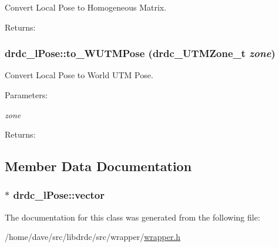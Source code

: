 Convert Local Pose to Homogeneous Matrix. 

\begin{Desc}
\item[Returns:]\end{Desc}
\hypertarget{classdrdc__lPose_1e5f7f1156fd80a1b41aa1e11e56dab4}{
\subsubsection[to\_\-WUTMPose]{ drdc\_\-lPose::to\_\-WUTMPose ({\bf drdc\_\-UTMZone\_\-t} {\em zone})}}
\label{classdrdc__lPose_1e5f7f1156fd80a1b41aa1e11e56dab4}


Convert Local Pose to World UTM Pose. 

\begin{Desc}
\item[Parameters:]
\begin{description}
\item[{\em zone}]\end{description}
\end{Desc}
\begin{Desc}
\item[Returns:]\end{Desc}


\subsection{Member Data Documentation}
\hypertarget{classdrdc__lPose_92a783818add679fa656ffc4913c71ce}{
\subsubsection[vector]{$\ast$ {\bf drdc\_\-lPose::vector}}}
\label{classdrdc__lPose_92a783818add679fa656ffc4913c71ce}




The documentation for this class was generated from the following file:\begin{CompactItemize}
\item 
/home/dave/src/libdrdc/src/wrapper/\hyperlink{wrapper_8h}{wrapper.h}\end{CompactItemize}
